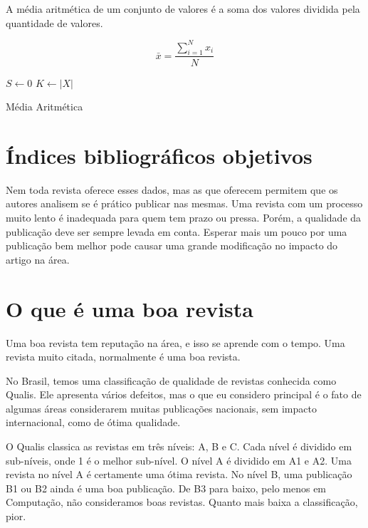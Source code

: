 \documentclass[openany]{book}
\begin{document}
A média aritmética de um conjunto de valores é a soma dos valores dividida pela quantidade de valores.

\begin{equation}
    \bar{x} = \frac{\sum\limits_{i=1}^{N}x_i}{N}
\end{equation}

\begin{algorithm}
    $S \leftarrow 0$ \;
    $K \leftarrow |X|$ \;
    \caption{Média Aritmética}
\end{algorithm}

\section{Índices bibliográficos objetivos}


 Nem toda revista oferece esses dados, mas as que oferecem permitem que os autores analisem se é prático publicar nas mesmas. Uma revista com um processo muito lento é inadequada para quem tem prazo ou pressa. Porém, a qualidade da publicação deve ser sempre levada em conta. Esperar mais um pouco por uma publicação bem melhor pode causar uma grande modificação no impacto do artigo na área.

\section{O que é uma boa revista}

Uma boa revista tem reputação na área, e isso se aprende com o tempo. Uma revista muito citada, normalmente é uma boa revista.

No Brasil, temos uma classificação de qualidade de revistas conhecida como Qualis. Ele apresenta vários defeitos, mas o que eu considero principal é o fato de algumas áreas considerarem muitas publicações nacionais, sem impacto internacional, como de ótima qualidade.

O Qualis classica as revistas em três níveis: A, B e C. Cada nível é dividido em sub-níveis, onde 1 é o melhor sub-nível. O nível A é dividido em A1 e A2. Uma revista no nível A é certamente uma ótima revista. No nível B, uma publicação B1 ou B2 ainda é uma boa publicação. De B3 para baixo, pelo menos em Computação, não consideramos boas revistas. Quanto mais baixa a classificação, pior.
\end{document}
